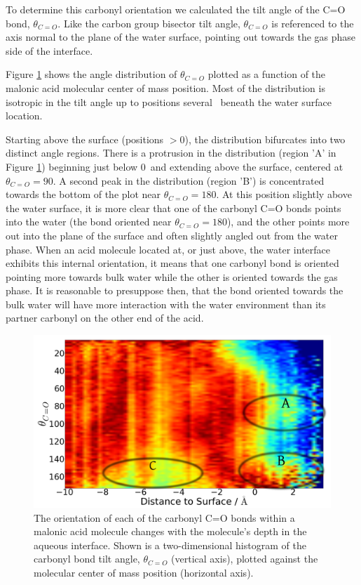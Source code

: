 To determine this carbonyl orientation we calculated the tilt angle of the C=O bond, $\theta_{C=O}$. Like the carbon group bisector tilt angle, $\theta_{C=O}$ is referenced to the axis normal to the plane of the water surface, pointing out towards the gas phase side of the interface.

Figure \ref{fig:carbonyl-tilt} shows the angle distribution of $\theta_{C=O}$ plotted as a function of the malonic acid molecular center of mass position. Most of the distribution is isotropic in the tilt angle up to positions several \angs~beneath the water surface location.

Starting above the surface (positions $>0$\angs), the distribution bifurcates into two distinct angle regions. There is a protrusion in the distribution (region 'A' in Figure \ref{fig:carbonyl-tilt}) beginning just below 0\angs~and extending above the surface, centered at $\theta_{C=O}=90$\textdegree. A second peak in the distribution (region 'B') is concentrated towards the bottom of the plot near $\theta_{C=O}=180$\textdegree. At this position slightly above the water surface, it is more clear that one of the carbonyl C=O bonds points into the water (the bond oriented near $\theta_{C=O}=180$\textdegree), and the other points more out into the plane of the surface and often slightly angled out from the water phase.  When an acid molecule located at, or just above, the water interface exhibits this internal orientation, it means that one carbonyl bond is oriented pointing more towards bulk water while the other is oriented towards the gas phase. It is reasonable to presuppose then, that the bond oriented towards the bulk water will have more interaction with the water environment than its partner carbonyl on the other end of the acid.


\begin{figure}[h!]
	\begin{center}
		\includegraphics[scale=1.0]{images/malonic-angles/carbonyl-theta-distance-circles.png}
		\caption{The orientation of each of the carbonyl C=O bonds within a malonic acid molecule changes with the molecule's depth in the aqueous interface. Shown is a two-dimensional histogram of the carbonyl bond tilt angle, $\theta_{C=O}$ (vertical axis), plotted against the molecular center of mass position (horizontal axis).}  
		\label{fig:carbonyl-tilt}
	\end{center}
\end{figure}

